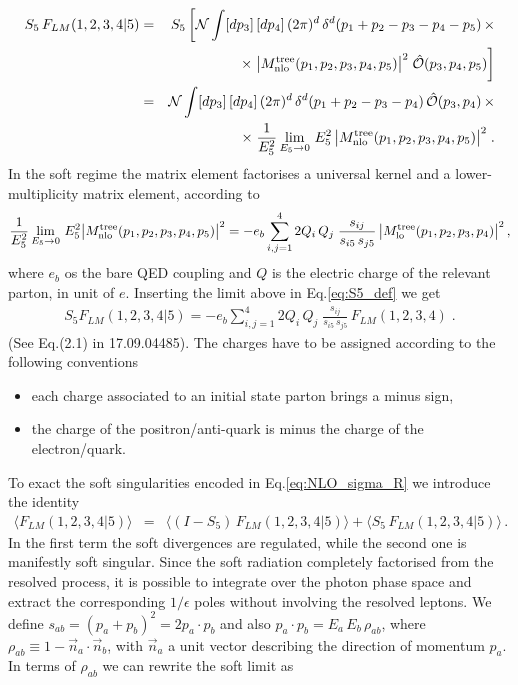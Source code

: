 \documentclass[12pt,a4paper]{article}
\newcommand{\nn}{\nonumber}
\newcommand{\eps}{\epsilon}
\newcommand{\beq}{\begin{eqnarray}}
\newcommand{\eeq}{\end{eqnarray}}
\begin{document}
\beq
S_5 \, F_{LM}(1,2,3,4|5)
&=&
S_5 \,  \bigg[
\mathcal{N} \int [dp_3] \, [dp_4] \,(2\pi)^{d} \, 
\delta^d(p_1+p_2-p_3-p_4-p_5) \, \times
\nn \\
&& \qquad \qquad 
\times \; 
\big| M_{\rm nlo}^{\rm tree}(p_1,p_2,p_3,p_4,p_5) \big|^2 \;
\hat{\mathcal{O}}(p_3, p_4,p_5)
\bigg]
\nn \\
&=&
\mathcal{N} \int [dp_3] \, [dp_4] \,(2\pi)^{d} \, 
\delta^d(p_1+p_2-p_3-p_4) \,
\hat{\mathcal{O}}(p_3, p_4) \,  \times
\nn \\
&& \qquad \qquad 
\times \; 
\frac{1}{E_5^2} \lim_{E_5 \rightarrow 0} \, 
E_5 ^2 \,
\big| M_{\rm nlo}^{\rm tree}(p_1,p_2,p_3,p_4,p_5) \big|^2 \;.
\label{eq:S5_def}
\eeq
In the soft regime the matrix element factorises a universal kernel and a lower-multiplicity matrix element, according to
\beq
\frac{1}{E_5^2} \lim_{E_5 \rightarrow 0} \, 
E_5^2
\big| M_{\rm nlo}^{\rm tree}(p_1,p_2,p_3,p_4,p_5) \big|^2
=
- e_b \sum_{i,j=1}^4 2 Q_i \, Q_j \; \frac{s_{ij}}{s_{i5} \,s_{j5}} \, \big| M_{\rm lo}^{\rm tree}(p_1, p_2, p_3, p_4)\big|^2 \, ,
\eeq
where $e_b$ os the bare QED coupling and $Q$ is the electric charge of the relevant parton, in unit of $e$. Inserting the limit above in Eq.\eqref{eq:S5_def} we get
\beq
S_5 F_{LM}(1,2, 3, 4|5)= - e_b \sum_{i,j=1}^4 2 Q_i \, Q_j \; \frac{s_{ij}}{s_{i5} \,s_{j5}} \, F_{LM}(1,2, 3, 4)\; .
\label{eq:soft_factorisation}
\eeq
(See Eq.(2.1) in 17.09.04485). 
The charges have to be assigned according to the following conventions
\begin{itemize}
\item each charge associated to an initial state parton brings a minus sign, 
\item the charge of the positron/anti-quark is minus the charge of the electron/quark.
\end{itemize}
To exact the soft singularities encoded in Eq.\eqref{eq:NLO_sigma_R} we introduce the identity  
\beq
\langle F_{LM}(1,2,3,4|5)\rangle &=&
\langle (I-S_5) \, F_{LM}(1,2,3,4|5)\rangle +\langle S_5 \, F_{LM}(1,2,3,4|5)\rangle  \,. 
\label{eq:soft_reg}
\eeq
In the first term the soft divergences are regulated, while the second one is manifestly soft singular. Since the soft radiation completely factorised from the resolved process, it is possible to integrate over the photon phase space and extract the corresponding $1/\eps$ poles without involving the resolved leptons. 
We define $s_{ab} = (p_a+p_b)^2= 2p_a\cdot p_b$ and also $p_a \cdot p_b = E_a \, E_b \, \rho_{ab}$, where $\rho_{ab} \equiv 1-\overset{\rightarrow}{n}_a \cdot \overset{\rightarrow}{n}_b$, with $ \overset{\rightarrow}{n}_a$ a unit vector describing the direction of momentum $p_a$. In terms of $\rho_{ab}$ we can rewrite the soft limit as 
\end{document}
